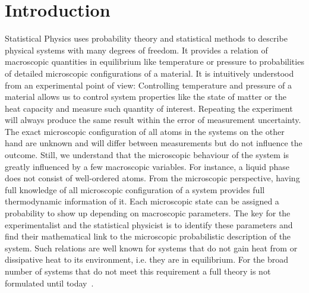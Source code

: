 % 
% 
% 
% 
% 


\chapter{Introduction}


Statistical Physics uses probability theory and statistical methods to describe physical systems with many degrees of freedom. It provides a relation of macroscopic quantities in equilibrium like temperature or pressure to probabilities of detailed microscopic configurations of a material. It is intuitively understood from an experimental point of view: Controlling temperature and pressure of a material allows us to control system properties like the state of matter or the heat capacity and measure such quantity of interest. Repeating the experiment will always produce the same result within the error of measurement uncertainty. The exact microscopic configuration of all atoms in the systems on the other hand are unknown and will differ between measurements but do not influence the outcome. Still,  we understand that the microscopic behaviour of the system is greatly influenced by a few macroscopic variables. For instance, a liquid phase does not consist of well-ordered atoms.  From the microscopic perspective, having full knowledge of all microscopic configuration of a system provides full thermodynamic information of it. Each microscopic state can be assigned a probability to show up depending on macroscopic parameters. The key for the experimentalist and the statistical physicist is to identify these parameters and find their mathematical link to the microscopic probabilistic description of the system. Such relations are well known for systems that do not gain heat from or dissipative heat to its environment, i.e. they are in equilibrium.  For the broad number of systems that do not meet this requirement a full theory is not formulated until today~\cite{dougherty1994foundations}. 

